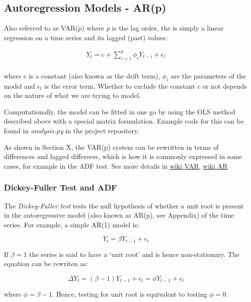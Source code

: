 \documentclass{article}
\begin{document}
    \subsection{Autoregression Models -
AR(p)}\label{autoregression-models---arp}

Also referred to as VAR(p) where \emph{p} is the lag order, the is
simply a linear regression on a time series and its lagged (past)
values:

\[
\begin{align}
Y_t = c + \sum^{p}_{i=1} \phi_i Y_{t-i} + \epsilon_t \\
\end{align}
\]

where c is a constant (also known as the drift term), \(\phi_i\) are the
parameters of the model and \(\epsilon_t\) is the error term. Whether to
exclude the constant \(c\) or not depends on the nature of what we are
trying to model.

Computationally, the model can be fitted in one go by using the OLS
method described above with a special matrix formulation. Example code
for this can be found in \emph{analysis.py} in the project repository.

As shown in Section X, the VAR(p) system can be rewritten in terms of
differences and lagged differeces, which is how it is commonly expressed
in some cases, for example in the ADF test. See more details in
\href{https://en.wikipedia.org/wiki/Vector_autoregression}{wiki VAR},
\href{https://en.wikipedia.org/wiki/Autoregressive_model}{wiki AR}

    \subsubsection{Dickey-Fuller Test and
ADF}\label{dickey-fuller-test-and-adf}

The \emph{Dickey-Fuller test} tests the null hypothesis of whether a
unit root is present in the autoregressive model (also known as AR(p),
see Appendix) of the time series. For example, a simple AR(1) model is:

\[
Y_t = \beta Y_{t-1} + \epsilon_t
\]

If \(\beta=1\) the series is said to have a `unit root' and is hence
non-stationary. The equation can be rewriten as:

\[
\Delta Y_t = (\beta - 1) Y_{t-1} + \epsilon_t = \phi Y_{t-1} + \epsilon_t
\]

where \(\phi= \beta-1\). Hence, testing for unit root is equivalent to
testing \(\phi=0\).
\end{document}
